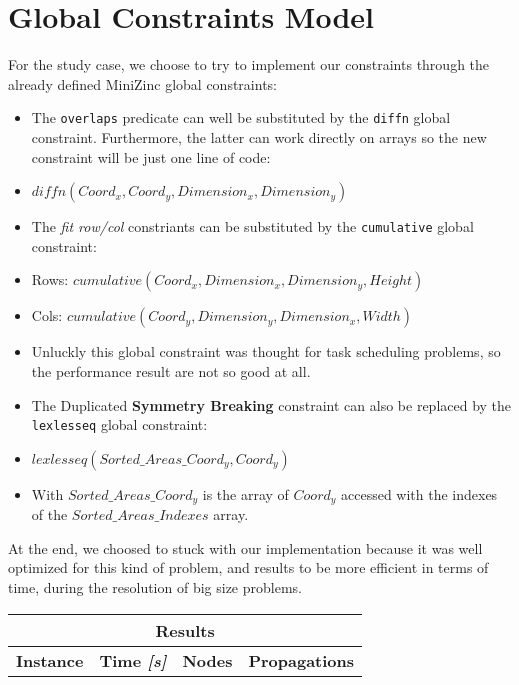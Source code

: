 \section{Global Constraints Model}
For the study case, we choose to try to implement our constraints through the already defined MiniZinc global constraints:

\begin{itemize}
    \item The \texttt{overlaps} predicate can well be substituted by the \texttt{diffn} global constraint.
            Furthermore, the latter can work directly on arrays so the new constraint will be just one line of code:
    \item[] $diffn(Coord_x, Coord_y, Dimension_x, Dimension_y)$
    \item The \textit{fit row/col} constriants can be substituted by the \texttt{cumulative} global constraint:
    \item[] Rows: $cumulative(Coord_x, Dimension_x, Dimension_y, Height)$
    \item[] Cols: $cumulative(Coord_y, Dimension_y, Dimension_x, Width)$
    \item[] Unluckly this global constraint was thought for task scheduling problems, so the performance result are not so good at all.
    \item The Duplicated \textbf{Symmetry Breaking} constraint can also be replaced by the \texttt{lexlesseq} global constraint:
    \item[] $lexlesseq(Sorted\_Areas\_Coord_y, Coord_y)$
    \item[] With $Sorted\_Areas\_Coord_y$ is the array of $Coord_y$ accessed with the indexes of the $Sorted\_Areas\_Indexes$ array.   
\end{itemize}

At the end, we choosed to stuck with our implementation because it was well optimized for this kind of problem, and results to be more
efficient in terms of time, during the resolution of big size problems.

\begin{center}
    \begin{tabular}{|c|c|c|c|}
        \hline
        \multicolumn{4}{|c|}{\textbf{Results}} \\
        \hline
        \textbf{Instance} & \textbf{Time \textit{[s]}} & \textbf{Nodes} & \textbf{Propagations} \\
        \hline
    \end{tabular}
\end{center}

